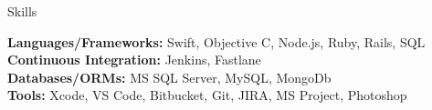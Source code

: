 \documentclass{resume} %
\begin{document}

\begin{rSection}{Skills}

\textbf{Languages/Frameworks:} Swift, Objective C, Node.js, Ruby, Rails, SQL  \\
\textbf{Continuous Integration:} Jenkins, Fastlane \\
\textbf{Databases/ORMs:} MS SQL Server, MySQL, MongoDb  \\
\textbf{Tools:} Xcode, VS Code, Bitbucket, Git, JIRA, MS Project, Photoshop  \\

\end{rSection}

\end{document}
